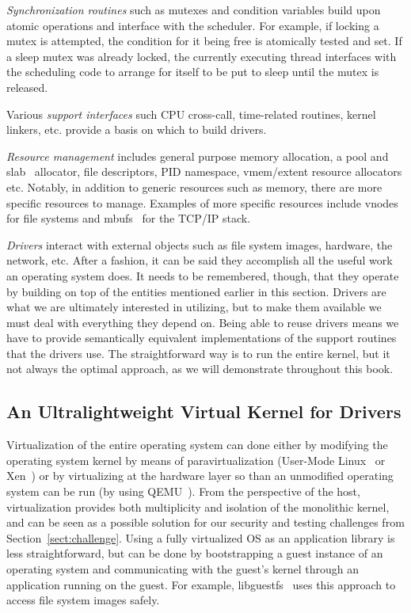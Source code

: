 \textit{Synchronization routines} such as mutexes and condition
variables build upon atomic operations and interface with the scheduler.
For example, if locking a mutex is attempted, the condition for it being
free is atomically tested and set.  If a sleep mutex was already locked,
the currently executing thread interfaces with the scheduling code to
arrange for itself to be put to sleep until the mutex is released.

Various \textit{support interfaces} such CPU cross-call, time-related
routines, kernel linkers, etc. provide a basis on which to build drivers.

\textit{Resource management} includes general purpose memory
allocation, a pool and slab~\cite{bonwick:slab} allocator, file
descriptors, PID namespace, vmem/extent resource allocators etc.
Notably, in addition to generic resources such as memory,
there are more specific resources to manage.  Examples
of more specific resources include vnodes~\cite{kleiman:vnodes} for file
systems and mbufs~\cite{stevens:tcpip2} for the TCP/IP stack.

\textit{Drivers} interact with external objects such as file
system images, hardware, the network, etc.  After a fashion, it
can be said they accomplish all the useful work an operating system
does.  It needs to be remembered, though, that they operate
by building on top of the entities mentioned earlier in this section.
Drivers are what we are ultimately interested in utilizing, but to
make them available we must deal with everything they depend on.
Being able to reuse drivers means we have to provide semantically
equivalent implementations of the support routines that the drivers use.
The straightforward way is to run the entire kernel, but it not always
the optimal approach, as we will demonstrate throughout this book.

\subsection{An Ultralightweight Virtual Kernel for Drivers}
\label{sect:conceptintro}

Virtualization of the entire operating system can done either by
modifying the operating system kernel by means of paravirtualization
(\eg User-Mode Linux~\cite{dike:uml} or Xen~\cite{barham:xen}) or by virtualizing at the
hardware layer so than an unmodified operating system can be run
(by using \eg QEMU~\cite{bellard:qemu}).  From the perspective of
the host, virtualization provides both multiplicity and isolation
of the monolithic kernel, and can be seen as a possible solution
for our security and testing challenges from Section~\ref{sect:challenge}.
Using a fully virtualized OS as an application library is less
straightforward, but can be done by bootstrapping a guest instance
of an operating system and communicating with the guest's kernel
through an application running on the guest.  For example,
libguestfs~\cite{libguestfs} uses this approach to access file
system images safely.

